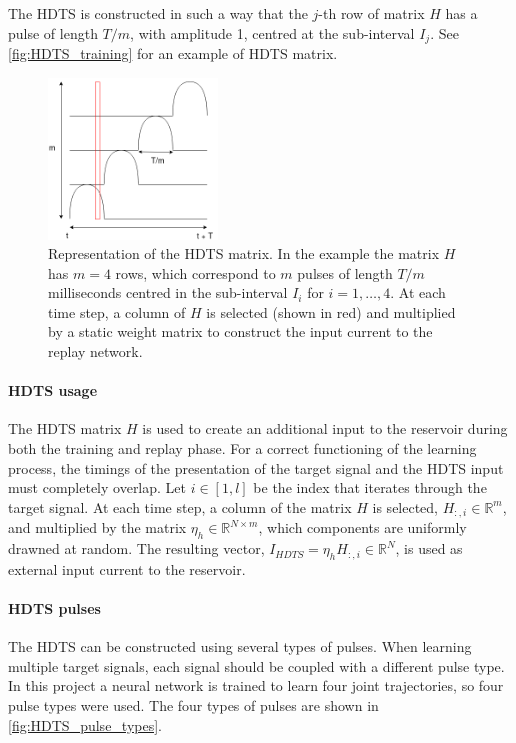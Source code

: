 \documentclass[10pt,a4paper, final]{report} %
\begin{document}
The HDTS is constructed in such a way that the $j$-th row of matrix $H$ has a pulse of length $T/m$, with amplitude 1, centred  at the sub-interval $I_j$. See \autoref{fig:HDTS_training} for an example of HDTS matrix.

\begin{figure}[H]
\centering
\includegraphics[width=0.4\textwidth]{images/HDTS_training}
\caption{Representation of the HDTS matrix. In the example the matrix $H$ has $m=4$ rows, which correspond to $m$ pulses of length $T/m$ milliseconds centred in the sub-interval $I_i$ for $i =1,\ldots,4$.
At each time step, a column of $H$ is selected (shown in red) and multiplied by a static weight matrix to construct the input current to the replay network.}
\label{fig:HDTS_training}
\end{figure}

\paragraph{HDTS usage}
The HDTS matrix $H$ is used to create an additional input to the reservoir during both the training and replay phase. For a correct functioning of the learning process, the timings of the presentation of the target signal and the HDTS input must completely overlap. Let $i \in [1, l]$ be the index that iterates through the target signal. At each time step, a column of the matrix $H$ is selected, $H_{:,i} \in \mathbb{R}^m$, and multiplied by the matrix $\eta_h \in \mathbb{R}^{N \times m}$, which components are uniformly drawned at random. The resulting  vector, $I_{HDTS} = \eta_h H_{:,i} \in \mathbb{R}^N$, is used as external input current to the reservoir.

\paragraph{HDTS pulses}
The HDTS can be constructed using several types of pulses. When learning multiple target signals, each signal should be coupled with a different pulse type. In this project a neural network is trained to learn four joint trajectories, so four pulse types were used. The four types of pulses are shown in \autoref{fig:HDTS_pulse_types}.
\end{document}

